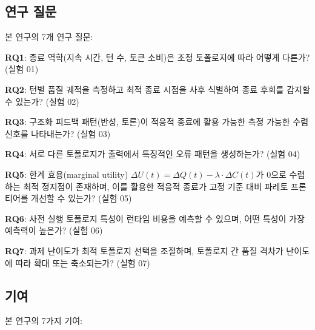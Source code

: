 \documentclass[a4paper,11pt]{article}
\begin{document}
\subsection{연구 질문}

본 연구의 7개 연구 질문:

\textbf{RQ1}: 종료 역학(지속 시간, 턴 수, 토큰 소비)은 조정 토폴로지에 따라 어떻게 다른가? (실험 01)

\textbf{RQ2}: 턴별 품질 궤적을 측정하고 최적 종료 시점을 사후 식별하여 종료 후회를 감지할 수 있는가? (실험 02)

\textbf{RQ3}: 구조화 피드백 패턴(반성, 토론)이 적응적 종료에 활용 가능한 측정 가능한 수렴 신호를 나타내는가? (실험 03)

\textbf{RQ4}: 서로 다른 토폴로지가 출력에서 특징적인 오류 패턴을 생성하는가? (실험 04)

\textbf{RQ5}: 한계 효용(marginal utility) $\Delta U(t) = \Delta Q(t) - \lambda \cdot \Delta C(t)$가 0으로 수렴하는 최적 정지점이 존재하며, 이를 활용한 적응적 종료가 고정 기준 대비 파레토 프론티어를 개선할 수 있는가? (실험 05)

\textbf{RQ6}: 사전 실행 토폴로지 특성이 런타임 비용을 예측할 수 있으며, 어떤 특성이 가장 예측력이 높은가? (실험 06)

\textbf{RQ7}: 과제 난이도가 최적 토폴로지 선택을 조절하며, 토폴로지 간 품질 격차가 난이도에 따라 확대 또는 축소되는가? (실험 07)

\subsection{기여}

본 연구의 7가지 기여:
\end{document}
